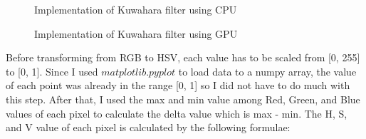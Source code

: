 \documentclass{article}
\begin{document}
\begin{figure}[H]
    \caption{Implementation of Kuwahara filter using CPU}
\end{figure}

\begin{figure}[H]
    \caption{Implementation of Kuwahara filter using GPU}
\end{figure}

Before transforming from RGB to HSV, each value has to be scaled from [0, 255] to [0, 1]. Since I used $matplotlib.pyplot$ to load data to a numpy array, the value of each point was already in the range [0, 1] so I did not have to do much with this step. After that, I used the max and min value among Red, Green, and Blue values of each pixel to calculate the delta value which is max - min. The H, S, and V value of each pixel is calculated by the following formulae:
\end{document}
